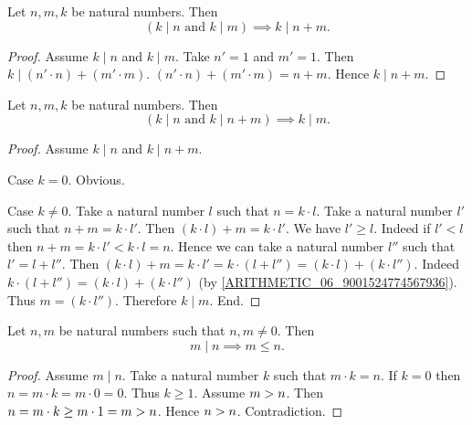 \documentclass[../arithmetic.tex]{subfiles}
\begin{document}
  \begin{forthel}
    \begin{corollary}
      Let $n, m, k$ be natural numbers.
      Then \[ (\text{$k \mid n$ and $k \mid m$}) \implies k \mid n \plus m. \]
    \end{corollary}
    \begin{proof}
      Assume $k \mid n$ and $k \mid m$.
      Take $n' = 1$ and $m' = 1$.
      Then $k \mid (n' \cdot n) \plus (m' \cdot m)$.
      $(n' \cdot n) \plus (m' \cdot m) = n \plus m$.
      Hence $k \mid n \plus m$.
    \end{proof}
  \end{forthel}

  \begin{forthel}
    \begin{proposition}
      Let $n, m, k$ be natural numbers.
      Then \[ (\text{$k \mid n$ and $k \mid n \plus m$}) \implies k \mid m. \]
    \end{proposition}
    \begin{proof}
      Assume $k \mid n$ and $k \mid n \plus m$.

      Case $k = 0$. Obvious.

      Case $k \neq 0$.
        Take a natural number $l$ such that $n = k \cdot l$.
        Take a natural number $l'$ such that $n \plus m = k \cdot l'$.
        Then $(k \cdot l) \plus m = k \cdot l'$.
        We have $l' \geq l$.
        Indeed if $l' \less l$ then
        $n \plus m
          = k \cdot l'
          \less k \cdot l
          = n$.
        Hence we can take a natural number $l''$ such that $l' = l \plus l''$.
        Then $(k \cdot l) \plus m
          = k \cdot l'
          = k \cdot (l \plus l'')
          = (k \cdot l) \plus (k \cdot l'')$.
        Indeed $k \cdot (l \plus l'') = (k \cdot l) \plus (k \cdot l'')$
        (by \cref{ARITHMETIC_06_9001524774567936}).
        Thus $m = (k \cdot l'')$.
        Therefore $k \mid m$.
      End.
    \end{proof}
  \end{forthel}

  \begin{forthel}
    \begin{proposition}
      Let $n, m$ be natural numbers such that $n, m \neq 0$.
      Then \[ m \mid n \implies m \leq n. \]
    \end{proposition}
    \begin{proof}
      Assume $m \mid n$.
      Take a natural number $k$ such that $m \cdot k = n$.
      If $k = 0$ then
      $n
        = m \cdot k
        = m \cdot 0
        = 0$.
      Thus $k \geq 1$.
      Assume $m > n$.
      Then $n
        = m \cdot k
        \geq m \cdot 1
        = m
        > n$.
      Hence $n > n$.
      Contradiction.
    \end{proof}
  \end{forthel}
\end{document}
